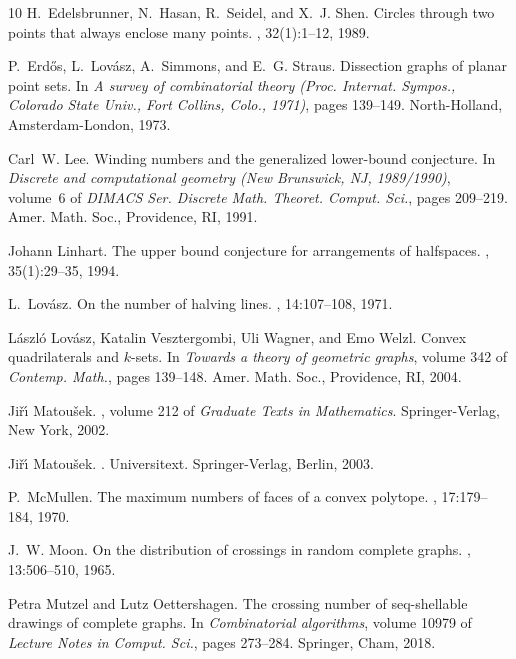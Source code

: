 \documentclass[11pt]{article}
\begin{document}
\begin{thebibliography}{10}
H.~Edelsbrunner, N.~Hasan, R.~Seidel, and X.~J. Shen.
\newblock Circles through two points that always enclose many points.
, 32(1):1--12, 1989.

P.~Erd\H{o}s, L.~Lov\'{a}sz, A.~Simmons, and E.~G. Straus.
\newblock Dissection graphs of planar point sets.
\newblock In {\em A survey of combinatorial theory ({P}roc. {I}nternat.
  {S}ympos., {C}olorado {S}tate {U}niv., {F}ort {C}ollins, {C}olo., 1971)},
  pages 139--149. North-Holland, Amsterdam-London, 1973.

Carl~W. Lee.
\newblock Winding numbers and the generalized lower-bound conjecture.
\newblock In {\em Discrete and computational geometry ({N}ew {B}runswick, {NJ},
  1989/1990)}, volume~6 of {\em DIMACS Ser. Discrete Math. Theoret. Comput.
  Sci.}, pages 209--219. Amer. Math. Soc., Providence, RI, 1991.

Johann Linhart.
\newblock The upper bound conjecture for arrangements of halfspaces.
, 35(1):29--35, 1994.

L.~Lov\'{a}sz.
\newblock On the number of halving lines.
,
  14:107--108, 1971.

L\'{a}szl\'{o} Lov\'{a}sz, Katalin Vesztergombi, Uli Wagner, and Emo Welzl.
\newblock Convex quadrilaterals and {$k$}-sets.
\newblock In {\em Towards a theory of geometric graphs}, volume 342 of {\em
  Contemp. Math.}, pages 139--148. Amer. Math. Soc., Providence, RI, 2004.

Ji\v{r}\'{\i} Matou\v{s}ek.
, volume 212 of {\em Graduate
  Texts in Mathematics}.
\newblock Springer-Verlag, New York, 2002.

Ji\v{r}\'{\i} Matou\v{s}ek.
.
\newblock Universitext. Springer-Verlag, Berlin, 2003.

P.~McMullen.
\newblock The maximum numbers of faces of a convex polytope.
, 17:179--184, 1970.

J.~W. Moon.
\newblock On the distribution of crossings in random complete graphs.
, 13:506--510, 1965.

Petra Mutzel and Lutz Oettershagen.
\newblock The crossing number of seq-shellable drawings of complete graphs.
\newblock In {\em Combinatorial algorithms}, volume 10979 of {\em Lecture Notes
  in Comput. Sci.}, pages 273--284. Springer, Cham, 2018.


\end{thebibliography}
\end{document}
